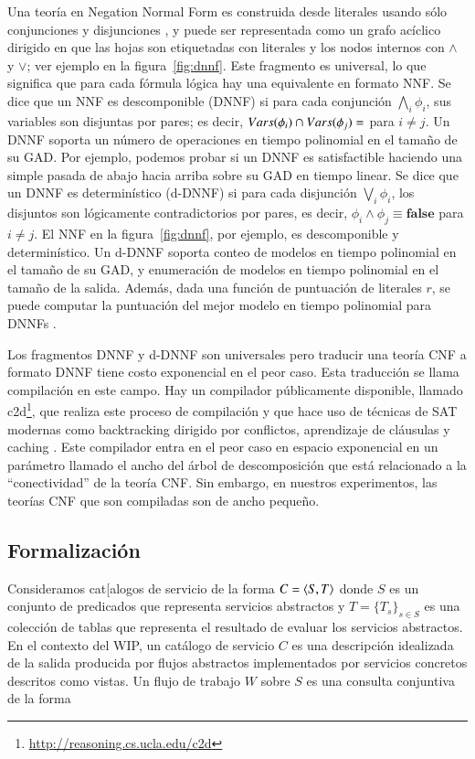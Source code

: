Una teoría en Negation Normal Form es construida desde literales usando sólo
conjunciones y disjunciones \cite{barwise:handbook}, y puede ser representada como un grafo
acíclico dirigido en que las hojas son etiquetadas con literales y los nodos
internos con $\land$ y $\lor$; ver ejemplo en la figura~\ref{fig:dnnf}. Este
fragmento es universal, lo que significa que para cada fórmula lógica hay una
equivalente en formato NNF. Se dice que un NNF es descomponible (DNNF)
\cite{darwiche:d-dnnfs}
si para cada conjunción $\bigwedge_i\phi_i$, sus variables son disjuntas por pares; es
decir, $Vars(\phi_i)\cap Vars(\phi_j)=\empty$ para $i\neq j$. Un DNNF soporta un
número de operaciones en tiempo polinomial en el tamaño de su GAD. Por ejemplo,
podemos probar si un DNNF es satisfactible haciendo una simple pasada de abajo
hacia arriba sobre su GAD en tiempo linear. Se dice que un DNNF es
determinístico (d-DNNF) \cite{darwiche:d-dnnfs} si para cada disjunción $\bigvee_i\phi_i$, los
disjuntos son lógicamente contradictorios por pares, es decir,
$\phi_i\land\phi_j\equiv\textbf{false}$ para $i\neq j$.
El NNF en la figura~\ref{fig:dnnf}, por ejemplo, es
descomponible y determinístico. Un d-DNNF soporta conteo de modelos en
tiempo polinomial en el tamaño de su GAD, y enumeración de modelos en tiempo
polinomial en el tamaño de la salida. Además, dada una función de puntuación de
literales $r$, se puede computar la puntuación del mejor modelo en tiempo
polinomial para DNNFs \cite{darwiche:weighted}.

Los fragmentos DNNF y d-DNNF son universales pero traducir una teoría CNF a
formato DNNF tiene costo exponencial en el peor caso. Esta traducción se
llama compilación en este campo. Hay un compilador públicamente disponible,
llamado c2d\footnote{\url{http://reasoning.cs.ucla.edu/c2d}}, que realiza este proceso de compilación y que hace uso
de técnicas de SAT modernas como backtracking dirigido por conflictos,
aprendizaje de cláusulas y caching \cite{darwiche:compiler}. Este compilador entra en el peor
caso en espacio exponencial en un parámetro llamado el ancho del árbol de
descomposición que está relacionado a la ``conectividad'' de la teoría CNF.
Sin embargo, en nuestros experimentos, las teorías CNF que son compiladas son de
ancho pequeño.

\subsection{Formalización}

Consideramos cat[alogos de servicio de la forma $C=\langle S,T \rangle$ donde $S$ es un
conjunto de predicados que representa servicios abstractos y $T=\{T_s\}_{s\in S}$ es una
colección de tablas que representa el resultado de evaluar los servicios
abstractos. En el contexto del WIP, un catálogo de servicio $C$ es una
descripción idealizada de la salida producida por flujos abstractos
implementados por servicios concretos descritos como vistas. Un flujo de trabajo
$W$ sobre $S$ es una consulta conjuntiva de la forma

